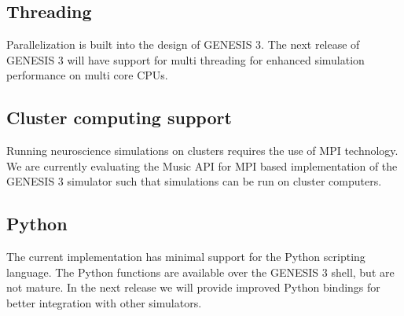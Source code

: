 \documentclass[12pt]{article}
\begin{document}
\subsection{Threading}

Parallelization is built into the design of GENESIS 3.  The next
release of GENESIS 3 will have support for multi threading for
enhanced simulation performance on multi core CPUs.

\subsection{Cluster computing support}

Running neuroscience simulations on clusters requires the use of MPI
technology.  We are currently evaluating the Music API for MPI based
implementation of the GENESIS 3 simulator such that simulations can be
run on cluster computers.

\subsection{Python}

The current implementation has minimal support for the Python
scripting language.  The Python functions are available over the
GENESIS 3 shell, but are not mature.  In the next release we will
provide improved Python bindings for better integration with other
simulators.
\end{document}
